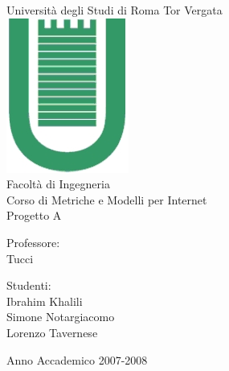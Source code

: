 \begin{titlepage}
\begin{center}
\LARGE{Università degli Studi di Roma Tor Vergata}\\
\vspace{10mm}
\includegraphics[scale=0.50]{etc/logo.jpg}\\
Facoltà di Ingegneria\\
\vspace{5mm}
\normalsize{Corso di Metriche e Modelli per Internet}\\
\vspace{20mm}
\large{Progetto A}\\
\end{center}
\vspace{40mm}
\begin{minipage}[t]{0.30\textwidth}
\begin{center}
{\normalsize{Professore:\\
Tucci}}
\end{center}
\end{minipage}
\hfill
\begin{minipage}[t]{0.30\textwidth}
\begin{center}
{\normalsize{Studenti:\\
Ibrahim Khalili\\
Simone Notargiacomo\\
Lorenzo Tavernese}}
\end{center}
\end{minipage}
\vspace{10mm}
\begin{center}
Anno Accademico 2007-2008
\end{center}

\end{titlepage}